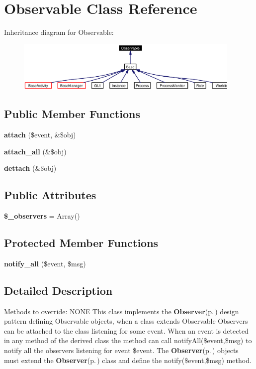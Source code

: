 \section{Observable Class Reference}
\label{classObservable}
Inheritance diagram for Observable:\begin{figure}[H]
\begin{center}
\leavevmode
\includegraphics[width=307pt]{classObservable__inherit__graph}
\end{center}
\end{figure}
\subsection*{Public Member Functions}
\begin{CompactItemize}
\item 
{\bf attach} (\$event, \&\$obj)
\item 
{\bf attach\_\-all} (\&\$obj)
\item 
{\bf dettach} (\&\$obj)
\end{CompactItemize}
\subsection*{Public Attributes}
\begin{CompactItemize}
\item 
{\bf \$\_\-observers} = Array()\label{classObservable_o0}

\end{CompactItemize}
\subsection*{Protected Member Functions}
\begin{CompactItemize}
\item 
{\bf notify\_\-all} (\$event, \$msg)
\end{CompactItemize}


\subsection{Detailed Description}
Methods to override: NONE This class implements the {\bf Observer}{\rm (p.\,\pageref{classObserver})} design pattern defining Observable objects, when a class extends Observable Observers can be attached to the class listening for some event. When an event is detected in any method of the derived class the method can call notify\-All(\$event,\$msg) to notify all the observers listening for event \$event. The {\bf Observer}{\rm (p.\,\pageref{classObserver})} objects must extend the {\bf Observer}{\rm (p.\,\pageref{classObserver})} class and define the notify(\$event,\$msg) method. 



